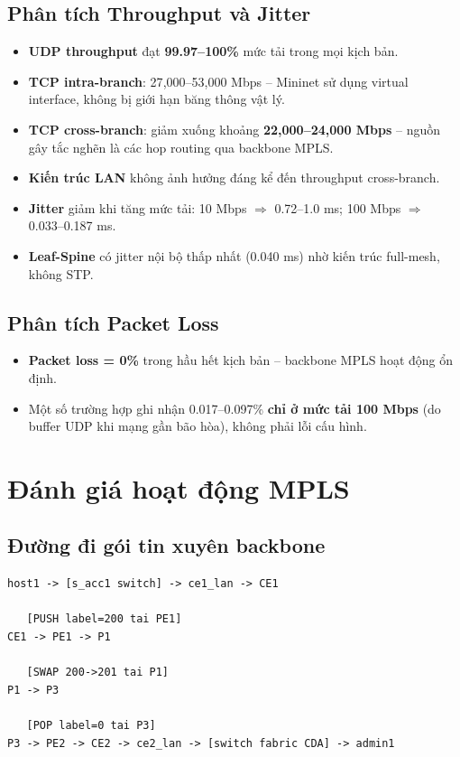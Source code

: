 \subsection{Phân tích Throughput và Jitter}

\begin{itemize}
    \item \textbf{UDP throughput} đạt \textbf{99.97--100\%} mức tải trong mọi kịch bản.
    \item \textbf{TCP intra-branch}: 27{,}000--53{,}000 Mbps -- Mininet sử dụng virtual interface,
          không bị giới hạn băng thông vật lý.
    \item \textbf{TCP cross-branch}: giảm xuống khoảng \textbf{22{,}000--24{,}000 Mbps} -- nguồn gây tắc nghẽn là các hop routing qua backbone MPLS.
    \item \textbf{Kiến trúc LAN} không ảnh hưởng đáng kể đến throughput cross-branch.
    \item \textbf{Jitter} giảm khi tăng mức tải: 10 Mbps $\Rightarrow$ 0.72--1.0 ms;
          100 Mbps $\Rightarrow$ 0.033--0.187 ms.
    \item \textbf{Leaf-Spine} có jitter nội bộ thấp nhất (0.040 ms) nhờ kiến trúc full-mesh, không STP.
\end{itemize}

\subsection{Phân tích Packet Loss}

\begin{itemize}
    \item \textbf{Packet loss = 0\%} trong hầu hết kịch bản -- backbone MPLS hoạt động ổn định.
    \item Một số trường hợp ghi nhận 0.017--0.097\% \textbf{chỉ ở mức tải 100 Mbps}
          (do buffer UDP khi mạng gần bão hòa), không phải lỗi cấu hình.
\end{itemize}

\section{Đánh giá hoạt động MPLS}

\subsection{Đường đi gói tin xuyên backbone}

\begin{Verbatim}[fontsize=\small, frame=single, label={Duong di goi tin xuyen backbone MPLS}]
host1 -> [s_acc1 switch] -> ce1_lan -> CE1

   [PUSH label=200 tai PE1]
CE1 -> PE1 -> P1

   [SWAP 200->201 tai P1]
P1 -> P3

   [POP label=0 tai P3]
P3 -> PE2 -> CE2 -> ce2_lan -> [switch fabric CDA] -> admin1
\end{Verbatim}

